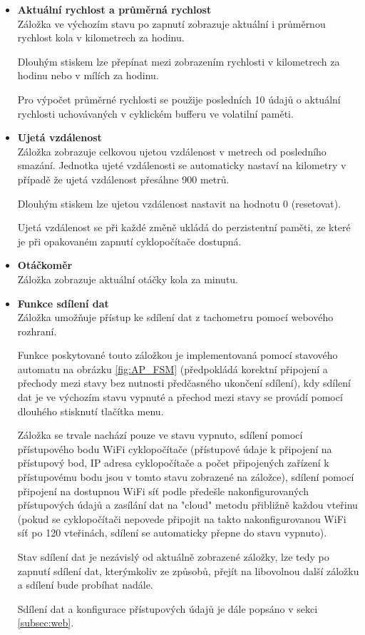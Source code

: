 \documentclass[twocolumn,a4paper,10pt]{article}
\begin{document}
\begin{itemize}
    \item \textbf{Aktuální rychlost a průměrná rychlost} \\
    Záložka ve výchozím stavu po zapnutí zobrazuje aktuální i průměrnou rychlost kola v kilometrech za hodinu.
    
    Dlouhým stiskem lze přepínat mezi zobrazením rychlosti v kilometrech za hodinu nebo v mílích za hodinu.

    Pro výpočet průměrné rychlosti se použije posledních 10 údajů o aktuální rychlosti uchovávaných v cyklickém bufferu ve volatilní paměti.

    \item \textbf{Ujetá vzdálenost} \\
    Záložka zobrazuje celkovou ujetou vzdálenost v metrech od posledního smazání. Jednotka ujeté vzdálenosti se automaticky nastaví na kilometry v případě že ujetá vzdálenost přesáhne 900 metrů.
    
    Dlouhým stiskem lze ujetou vzdálenost nastavit na hodnotu 0 (resetovat).

    Ujetá vzdálenost se při každé změně ukládá do perzistentní paměti, ze které je při opakovaném zapnutí cyklopočítače dostupná.

    \item \textbf{Otáčkoměr} \\
    Záložka zobrazuje aktuální otáčky kola za minutu.

    \item \textbf{Funkce sdílení dat} \\
    Záložka umožňuje přístup ke sdílení dat z tachometru pomocí webového rozhraní.
    
    Funkce poskytované touto záložkou je implementovaná pomocí stavového automatu na obrázku \ref{fig:AP_FSM} (předpokládá korektní připojení a přechody mezi stavy bez nutnosti předčasného ukončení sdílení), kdy sdílení dat je ve výchozím stavu vypnuté a přechod mezi stavy se provádí pomocí dlouhého stisknutí tlačítka menu.

    Záložka se trvale nachází pouze ve stavu vypnuto, sdílení pomocí přístupového bodu WiFi cyklopočítače (přístupové údaje k připojení na přístupový bod, IP adresa cyklopočítače a počet připojených zařízení k přístupovému bodu jsou v tomto stavu zobrazené na záložce), sdílení pomocí připojení na dostupnou WiFi síť podle předešle nakonfigurovaných přístupových údajů a zasílání dat na "cloud" metodu přibližně každou vteřinu (pokud se cyklopočítači nepovede připojit na takto nakonfigurovanou WiFi síť po 120 vteřinách, sdílení se automaticky přepne do stavu vypnuto).

    Stav sdílení dat je nezávislý od aktuálně zobrazené záložky, lze tedy po zapnutí sdílení dat, kterýmkoliv ze způsobů, přejít na libovolnou další záložku a sdílení bude probíhat nadále.

    Sdílení dat a konfigurace přístupových údajů je dále popsáno v sekci \ref{subsec:web}.
\end{itemize}
\end{document}
